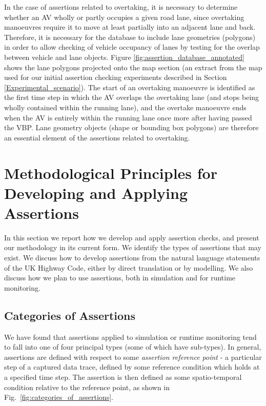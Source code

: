 In the case of assertions related to overtaking, it is necessary to determine whether an AV wholly or partly occupies a given road lane, since overtaking manoeuvres require it to move at least partially into an adjacent lane and back. Therefore, it is necessary for the database to include lane geometries (polygons) in order to allow checking of vehicle occupancy of lanes by testing for the overlap between vehicle and lane objects. Figure \ref{fig:assertion_database_annotated} shows the lane polygons projected onto the map section (an extract from the map used for our initial assertion checking experiments described in Section \ref{Experimental_scenario}). The start of an overtaking manoeuvre is identified as the first time step in which the AV overlaps the overtaking lane (and stops being wholly contained within the running lane), and the overtake manoeuvre ends when the AV is entirely within the running lane once more after having passed the VBP. Lane geometry objects (shape or bounding box polygons) are therefore an essential element of the assertions related to overtaking.

\section{Methodological Principles for Developing and Applying Assertions} \label{Use_of_assertions}
In this section we report how we develop and apply assertion checks, and present our methodology in its current form. We identify the types of assertions that may exist. We discuss how to develop assertions from the natural language statements of the UK Highway Code, either by direct translation or by modelling. We also discuss how we plan to use assertions, both in simulation and for runtime monitoring.

\subsection{Categories of Assertions} \label{assertion_categories}

We have found that assertions applied to simulation or runtime monitoring tend to fall into one of four principal types (some of which have sub-types). In general, assertions are defined with respect to some \emph{assertion reference point} - a particular step of a captured data trace, defined by some reference condition which holds at a specified time step. The assertion is then defined as some spatio-temporal condition relative to the reference point, as shown in Fig.~\ref{fig:categories_of_assertions}.


